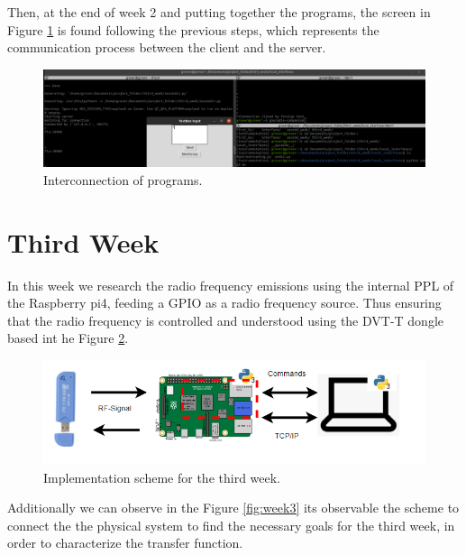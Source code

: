 \documentclass[12pt, twoside]{report}
\begin{document}

Then, at the end of week 2 and putting together the programs, the screen in Figure \ref{fig:intpro} is found following the previous steps, which represents the communication process between the client and the server.

\begin{figure}[!h]
\centering
  \includegraphics[width=\linewidth]{images/interface_fast.png}
  \caption{Interconnection of programs.}
  \label{fig:intpro}
\end{figure}


\section{Third Week}

In this week we research the radio frequency emissions using the internal PPL of the Raspberry pi4, feeding a GPIO as a radio frequency source. Thus ensuring that the radio frequency is controlled and understood using the DVT-T dongle based int he Figure \ref{fig:scheme3}. 
\begin{figure}[!h]
\centering
  \includegraphics[width=\linewidth]{images/scheme3a.png}
  \caption{Implementation scheme for the third week.}
  \label{fig:scheme3}
\end{figure}
Additionally we can observe in the Figure \ref{fig:week3} its observable the scheme to connect the the physical system to find the necessary goals for the third week, in order to characterize the transfer function.  
\end{document}
